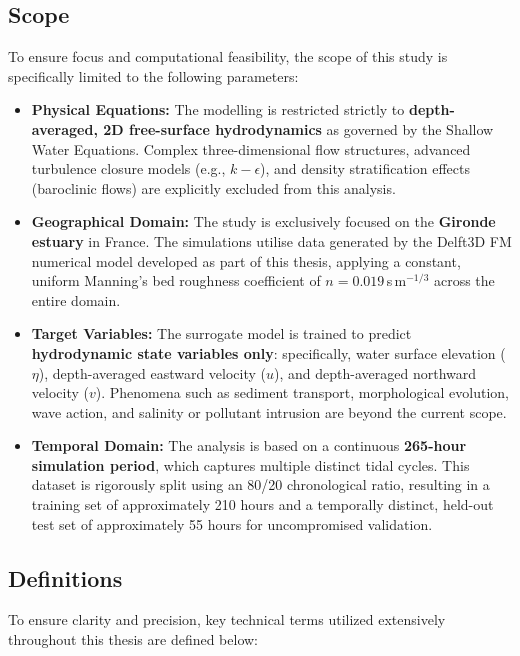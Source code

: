 \subsection*{Scope}

To ensure focus and computational feasibility, the scope of this study is specifically limited to the following parameters:

\begin{itemize}
    \item \textbf{Physical Equations:} The modelling is restricted strictly to \textbf{depth-averaged, 2D free-surface hydrodynamics} as governed by the Shallow Water Equations. Complex three-dimensional flow structures, advanced turbulence closure models (e.g., $k-\epsilon$), and density stratification effects (baroclinic flows) are explicitly excluded from this analysis.

    \item \textbf{Geographical Domain:} The study is exclusively focused on the \textbf{Gironde estuary} in France. The simulations utilise data generated by the Delft3D FM numerical model developed as part of this thesis, applying a constant, uniform Manning's bed roughness coefficient of $n = 0.019$\,s\,m$^{-1/3}$ across the entire domain.

    \item \textbf{Target Variables:} The surrogate model is trained to predict \textbf{hydrodynamic state variables only}: specifically, water surface
    elevation ($\eta$), depth-averaged eastward velocity ($u$), and
    depth-averaged northward velocity ($v$). Phenomena such as sediment transport, morphological evolution, wave action, and salinity or pollutant intrusion are beyond the current scope.

    \item \textbf{Temporal Domain:} The analysis is based on a continuous \textbf{265-hour simulation period}, which captures multiple distinct tidal cycles. This dataset is rigorously split using an 80/20 chronological ratio, resulting in a training set of approximately 210 hours and a temporally distinct, held-out test set of approximately 55 hours for uncompromised validation.
\end{itemize}

\subsection*{Definitions}

To ensure clarity and precision, key technical terms utilized extensively throughout this thesis are defined below:

